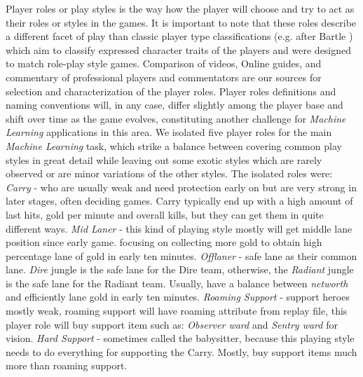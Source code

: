 Player roles or play styles is the way how the player will choose and try to act as their roles or styles in the games. It is important to note that these roles describe a different facet of play than classic player type classifications (e.g. after Bartle \cite{bartle1996hearts}) which aim to classify expressed character traits of the players and were designed to match role-play style games. Comparison of videos, Online guides, and commentary of professional players and commentators are our sources for selection and characterization of the player roles. Player roles definitions and naming conventions will, in any case, differ slightly among the player base and shift over time as the game evolves, constituting another challenge for \textit{Machine Learning} applications in this area. We isolated five player roles for the main \textit{Machine Learning} task, which strike a balance between covering common play styles in great detail while leaving out some exotic styles which are rarely observed or are minor variations of the other styles. The isolated roles were: \textit{Carry} - who are usually weak and need protection early on but are very strong in later stages, often deciding games. Carry typically end up with a high amount of last hits, gold per minute and overall kills, but they can get them in quite different ways. \textit{Mid Laner} - this kind of playing style mostly will get middle lane position since early game. focusing on collecting more gold to obtain high percentage lane of gold in early ten minutes. \textit{Offlaner} - safe lane as their common lane. \textit{Dire} jungle is the safe lane for the Dire team, otherwise, the \textit{Radiant} jungle is the safe lane for the Radiant team. Usually, have a balance between \textit{networth} and efficiently lane gold in early ten minutes. \textit{Roaming Support} - support heroes mostly weak, roaming support will have roaming attribute from replay file, this player role will buy support item such as: \textit{Observer ward} and \textit{Sentry ward} for vision. \textit{Hard Support} - sometimes called the babysitter, because this playing style needs to do everything for supporting the Carry. Mostly, buy support items much more than roaming support.
